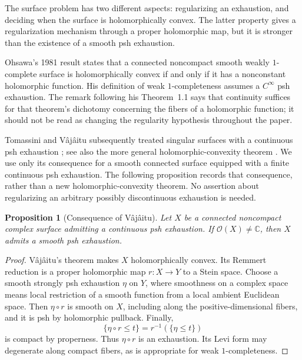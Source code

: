 \documentclass[11pt]{amsart}
\newtheorem{proposition}[theorem]{Proposition}
\theoremstyle{definition}
\theoremstyle{remark}
\numberwithin{equation}{section}
\newcommand{\C}{\mathbb C}
\newcommand{\OO}{\mathcal O}
\begin{document}
The surface problem has two different aspects: regularizing an exhaustion,
and deciding when the surface is holomorphically convex. The latter
property gives a regularization mechanism through a proper holomorphic
map, but it is stronger than the existence of a smooth psh exhaustion.

Ohsawa's 1981 result \cite[Proposition~1.4]{Ohsawa1981} states that a
connected noncompact smooth weakly $1$-complete surface is
holomorphically convex if and only if it has a nonconstant holomorphic
function. His definition of weak $1$-completeness assumes a
$C^\infty$ psh exhaustion. The remark following his Theorem~1.1 says
that continuity suffices for that theorem's dichotomy concerning the
fibers of a holomorphic function; it should not be read as changing the
regularity hypothesis throughout the paper.

Tomassini and V\^aj\^aitu subsequently treated singular surfaces with a
continuous psh exhaustion \cite{TomassiniVajaitu2008}; see also the
more general holomorphic-convexity theorem
\cite[Theorem~1.1]{Vajaitu2022}. We use only its consequence for a
smooth connected surface equipped with a finite continuous psh
exhaustion. The following proposition records that consequence,
rather than a new holomorphic-convexity theorem. No assertion about
regularizing an arbitrary possibly discontinuous exhaustion is needed.

\begin{proposition}[Consequence of V\^aj\^aitu]\label{prop:surface-nonconstant-function}
Let $X$ be a connected noncompact complex surface admitting a continuous
psh exhaustion. If $\OO(X)\ne\C$, then $X$ admits a smooth psh
exhaustion.
\end{proposition}

\begin{proof}
V\^aj\^aitu's theorem makes $X$ holomorphically convex. Its Remmert
reduction is a proper holomorphic map $r:X\to Y$ to a Stein space.
Choose a smooth strongly psh exhaustion $\eta$ on $Y$, where smoothness
on a complex space means local restriction of a smooth function from a
local ambient Euclidean space. Then $\eta\circ r$ is smooth on $X$,
including along the positive-dimensional fibers, and it is psh by
holomorphic pullback. Finally,
\[
 \{\eta\circ r\le t\}=r^{-1}(\{\eta\le t\})
\]
is compact by properness. Thus $\eta\circ r$ is an exhaustion. Its
Levi form may degenerate along compact fibers, as is appropriate for
weak $1$-completeness.
\end{proof}
\end{document}
